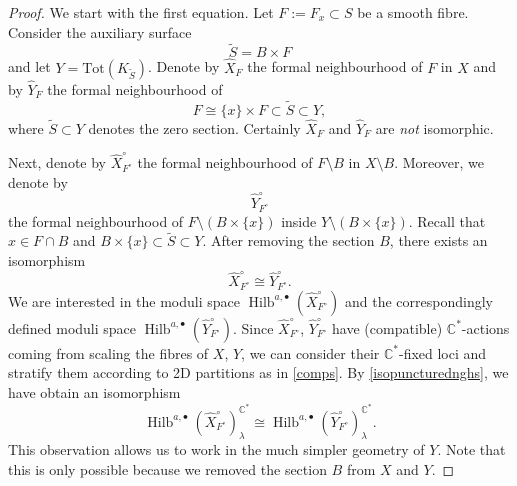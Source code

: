 \documentclass{amsart}
\theoremstyle{definition}
\newcommand{\CC} {\mathbb{C}}          %
\newcommand{\Hilb}{\operatorname{Hilb}}
\begin{document}
\begin{proof}
We start with the first equation. Let $F := F_x \subset S$ be a smooth fibre. Consider the auxiliary surface 
$$
\tilde{S} = B \times F
$$ 
and let $Y = \mathrm{Tot}(K_{\tilde{S}})$. 
Denote by $\widehat{X}_F$ the formal neighbourhood of $F$ in $X$ and by $\widehat{Y}_{F}$ the formal neighbourhood of
$$
F \cong \{x\} \times F \subset \tilde{S} \subset Y,
$$
where $\tilde{S} \subset Y$ denotes the zero section. Certainly $\widehat{X}_F$ and $\widehat{Y}_{F}$ are \emph{not} isomorphic. 

Next, denote by $\widehat{X}^{\circ}_{F^\circ}$ the formal neighbourhood of $F \setminus B$ in $X \setminus B$. Moreover, we denote by 
$$
\widehat{Y}_{F^{\circ}}^{\circ}
$$
the formal neighbourhood of $F \setminus (B \times \{x\})$ inside $Y \setminus (B \times \{x\})$. Recall that $x \in F \cap B$ and $B \times \{x\} \subset \tilde{S} \subset Y$. After removing the section $B$, there exists an isomorphism  
\begin{equation} \label{isopuncturednghs}
\widehat{X}^{\circ}_{F^\circ} \cong \widehat{Y}_{F^{\circ}}^{\circ}.
\end{equation}
We are interested in the moduli space $\Hilb^{a,\bullet}(\widehat{X}^{\circ}_{F^\circ})$ and the correspondingly defined moduli space $\Hilb^{a,\bullet}(\widehat{Y}^{\circ}_{F^\circ})$. Since $\widehat{X}^{\circ}_{F^\circ}$, $\widehat{Y}^{\circ}_{F^\circ}$ have (compatible) $\CC^*$-actions coming from scaling the fibres of $X$, $Y$, we can consider their $\CC^*$-fixed loci and stratify them according to 2D partitions as in \eqref{comps}. By \eqref{isopuncturednghs}, we have obtain an isomorphism   
$$
\Hilb^{a,\bullet}(\widehat{X}^{\circ}_{F^\circ})_{\lambda}^{\CC^*} \cong \Hilb^{a,\bullet}(\widehat{Y}^{\circ}_{F^\circ})_{\lambda}^{\CC^*}.
$$
This observation allows us to work in the much simpler geometry of $Y$. Note that this is only possible because we removed the section $B$ from $X$ and $Y$.


\end{proof}
\end{document}
